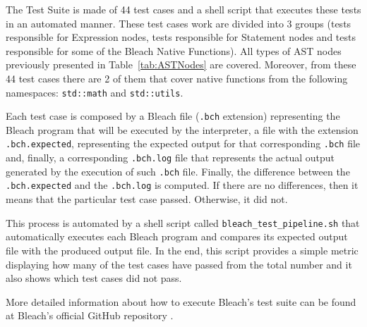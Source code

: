 The Test Suite is made of 44 test cases and a shell script that executes these tests in an automated manner. These test cases work are divided into 3 groups (tests responsible for Expression nodes, tests responsible for Statement nodes and tests responsible for some of the Bleach Native Functions). All types of AST nodes previously presented in Table~\ref{tab:ASTNodes} are covered. Moreover, from these 44 test cases there are 2 of them that cover native functions from the following namespaces: \texttt{std::math} and \texttt{std::utils}.

Each test case is composed by a Bleach file (\texttt{.bch} extension) representing the Bleach program that will be executed by the interpreter, a file with the extension 
 \texttt{.bch.expected}, representing the expected output for that corresponding \texttt{.bch} file and, finally, a corresponding \texttt{.bch.log} file that represents the actual output generated by the execution of such \texttt{.bch} file. Finally, the difference between the \texttt{.bch.expected} and the \texttt{.bch.log} is computed. If there are no differences, then it means that the particular test case passed. Otherwise, it did not.

 This process is automated by a shell script called \texttt{bleach\_test\_pipeline.sh} that automatically executes each Bleach program and compares its expected output file with the produced output file. In the end, this script provides a simple metric displaying how many of the test cases have passed from the total number and it also shows which test cases did not pass.

 More detailed information about how to execute Bleach's test suite can be found at Bleach's official GitHub repository \cite{bleach_lang_git_repo}.


